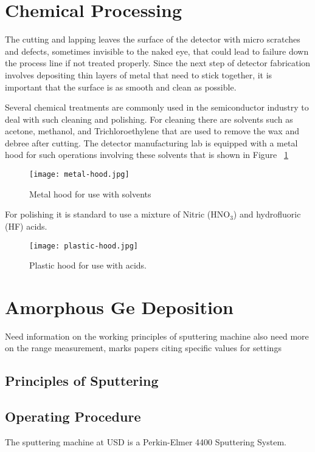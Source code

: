 \section{Chemical Processing}

The cutting and lapping leaves the surface of the detector with micro scratches and defects, sometimes invisible to the naked eye, that could lead to failure down the process line if not treated properly.
Since the next step of detector fabrication involves depositing thin layers of metal that need to stick together, it is important that the surface is as smooth and clean as possible.

Several chemical treatments are commonly used in the semiconductor industry to deal with such cleaning and polishing.
For cleaning there are solvents such as acetone, methanol, and Trichloroethylene that are used to remove the wax and debree after cutting.
The detector manufacturing lab is equipped with a metal hood for such operations involving these solvents that is shown in Figure ~\ref{fig:metalhood}
\begin{figure}[htpb]
\centering
\texttt{[image: metal-hood.jpg]}
\caption{Metal hood for use with solvents}
\label{fig:metalhood}
\end{figure}

For polishing it is standard to use a mixture of Nitric (HNO$_3$) and hydrofluoric (HF) acids.

\begin{figure}[htpb]
\centering
\texttt{[image: plastic-hood.jpg]}
\caption{Plastic hood for use with acids.}
\label{fig:plastichood}
\end{figure}

\section{Amorphous Ge Deposition}

Need information on the working principles of sputtering machine
also need more on the range measurement, marks papers citing specific values for settings 
\subsection{Principles of Sputtering}

\subsection{Operating Procedure}
The sputtering machine at USD is a Perkin-Elmer 4400 Sputtering System.

